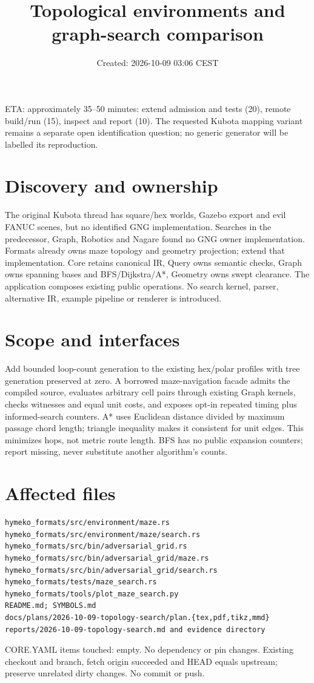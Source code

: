 \documentclass{article}
\title{Topological environments and graph-search comparison}
\date{Created: 2026-10-09 03:06 CEST}
\begin{document}
\maketitle
\noindent ETA: approximately 35--50 minutes: extend admission and tests (20), remote build/run (15), inspect and report (10). The requested Kubota mapping variant remains a separate open identification question; no generic generator will be labelled its reproduction.
\section*{Discovery and ownership}
The original Kubota thread has square/hex worlds, Gazebo export and evil FANUC scenes, but no identified GNG implementation. Searches in the predecessor, Graph, Robotics and Nagare found no GNG owner implementation. Formats already owns maze topology and geometry projection; extend that implementation. Core retains canonical IR, Query owns semantic checks, Graph owns spanning bases and BFS/Dijkstra/A*, Geometry owns swept clearance. The application composes existing public operations. No search kernel, parser, alternative IR, example pipeline or renderer is introduced.
\section*{Scope and interfaces}
Add bounded loop-count generation to the existing hex/polar profiles with tree generation preserved at zero. A borrowed maze-navigation facade admits the compiled source, evaluates arbitrary cell pairs through existing Graph kernels, checks witnesses and equal unit costs, and exposes opt-in repeated timing plus informed-search counters. A* uses Euclidean distance divided by maximum passage chord length; triangle inequality makes it consistent for unit edges. This minimizes hops, not metric route length. BFS has no public expansion counters; report missing, never substitute another algorithm's counts.
\section*{Affected files}
\begin{verbatim}
hymeko_formats/src/environment/maze.rs
hymeko_formats/src/environment/maze/search.rs
hymeko_formats/src/bin/adversarial_grid.rs
hymeko_formats/src/bin/adversarial_grid/maze.rs
hymeko_formats/src/bin/adversarial_grid/search.rs
hymeko_formats/tests/maze_search.rs
hymeko_formats/tools/plot_maze_search.py
README.md; SYMBOLS.md
docs/plans/2026-10-09-topology-search/plan.{tex,pdf,tikz,mmd}
reports/2026-10-09-topology-search.md and evidence directory
\end{verbatim}
CORE.YAML items touched: empty. No dependency or pin changes. Existing checkout and branch, fetch origin succeeded and HEAD equals upstream; preserve unrelated dirty changes. No commit or push.
\end{document}

